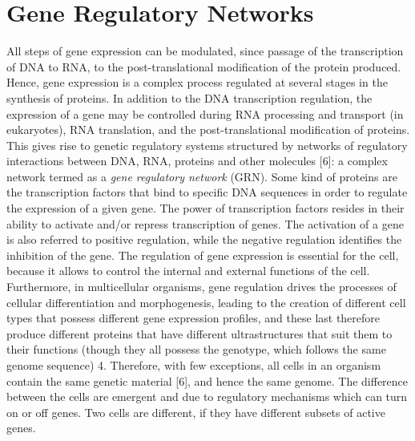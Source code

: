 \section{Gene Regulatory Networks}

All steps of gene expression can be modulated, since passage of the transcription of DNA to RNA, to the post-translational modification of the protein
produced. Hence, gene expression is a complex process regulated at several stages in the synthesis of proteins. In addition to the DNA transcription regulation, the expression of a gene may be controlled during RNA processing and transport (in eukaryotes), RNA translation, and the post-translational modification of proteins. This gives rise to genetic regulatory systems structured by networks of regulatory interactions between DNA, RNA, proteins and other molecules [6]: a complex network termed as a \emph{gene regulatory
network} (GRN). Some kind of proteins are the transcription factors that bind to specific DNA sequences in order to regulate the
expression of a given gene. The power of transcription factors resides in their ability to activate and/or repress transcription of genes. The activation of
a gene is also referred to positive regulation, while the negative regulation
identifies the inhibition of the gene.
The regulation of gene expression is essential for the cell, because it
allows to control the internal and external functions of the cell. Furthermore,
in multicellular organisms, gene regulation drives the processes of cellular
differentiation and morphogenesis, leading to the creation of different cell
types that possess different gene expression profiles, and these last therefore
produce different proteins that have different ultrastructures that suit them
to their functions (though they all possess the genotype, which follows the
same genome sequence) 4. Therefore, with few exceptions, all cells in an
organism contain the same genetic material [6], and hence the same genome. The difference between the cells are emergent and due to regulatory mechanisms which can turn on or off genes. Two cells are different, if they have different subsets of active genes.
